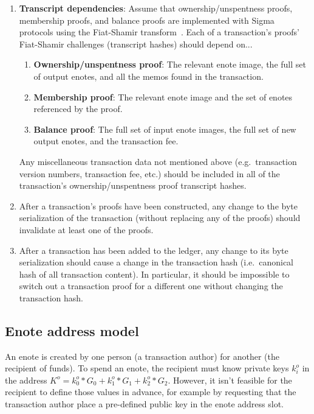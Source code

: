 \begin{enumerate}
    \item \textbf{Transcript dependencies}: Assume that ownership/unspentness proofs, membership proofs, and balance proofs are implemented with Sigma protocols using the Fiat-Shamir transform~\cite{fiat-shamir-transform}. Each of a transaction's proofs' Fiat-Shamir challenges (transcript hashes) should depend on...

    \begin{enumerate}
        \item \textbf{Ownership/unspentness proof}: The relevant enote image, the full set of output enotes, and all the memos found in the transaction.
        \item \textbf{Membership proof}: The relevant enote image and the set of enotes referenced by the proof.
        \item \textbf{Balance proof}: The full set of input enote images, the full set of new output enotes, and the transaction fee.
    \end{enumerate}

    Any miscellaneous transaction data not mentioned above (e.g.\ transaction version numbers, transaction fee, etc.) should be included in all of the transaction's ownership/unspentness proof transcript hashes.

    \item After a transaction's proofs have been constructed, any change to the byte serialization of the transaction (without replacing any of the proofs) should invalidate at least one of the proofs.

    \item After a transaction has been added to the ledger, any change to its byte serialization should cause a change in the transaction hash (i.e.\ canonical hash of all transaction content). In particular, it should be impossible to switch out a transaction proof for a different one without changing the transaction hash.
\end{enumerate}


\subsection{Enote address model}
\label{subsec:seraphis-address-model}

An enote is created by one person (a transaction author) for another (the recipient of funds). To spend an enote, the recipient must know private keys $k^o_i$ in the address $K^o = k^o_0*G_0 + k^o_1*G_1 + k^o_2*G_2$. However, it isn't feasible for the recipient to define those values in advance, for example by requesting that the transaction author place a pre-defined public key in the enote address slot.


